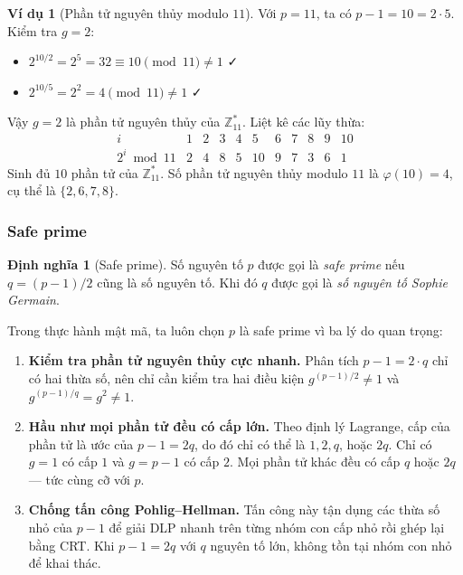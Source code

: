 \documentclass[12pt,a4paper]{report}
\theoremstyle{definition}
\newtheorem{definition}[theorem]{Định nghĩa}
\newtheorem{example}[theorem]{Ví dụ}
\theoremstyle{remark}
\begin{document}
\begin{example}[Phần tử nguyên thủy modulo $11$]
\label{ex:primroot-11}
Với $p = 11$, ta có $p - 1 = 10 = 2 \cdot 5$. Kiểm tra $g = 2$:
\begin{itemize}
    \item $2^{10/2} = 2^5 = 32 \equiv 10 \pmod{11} \neq 1$ \quad ✓
    \item $2^{10/5} = 2^2 = 4 \pmod{11} \neq 1$ \quad ✓
\end{itemize}
Vậy $g = 2$ là phần tử nguyên thủy của $\mathbb{Z}_{11}^*$. Liệt kê các lũy thừa:
\[
\begin{array}{c|cccccccccc}
i & 1 & 2 & 3 & 4 & 5 & 6 & 7 & 8 & 9 & 10 \\
\hline
2^i \bmod 11 & 2 & 4 & 8 & 5 & 10 & 9 & 7 & 3 & 6 & 1
\end{array}
\]
Sinh đủ $10$ phần tử của $\mathbb{Z}_{11}^*$. Số phần tử nguyên thủy modulo $11$ là $\varphi(10) = 4$, cụ thể là $\{2, 6, 7, 8\}$.
\end{example}

\subsubsection{Safe prime}
\label{subsubsec:safe-prime}

\begin{definition}[Safe prime]
Số nguyên tố $p$ được gọi là \emph{safe prime} nếu $q = (p-1)/2$ cũng là số nguyên tố. Khi đó $q$ được gọi là \emph{số nguyên tố Sophie Germain}.
\end{definition}

Trong thực hành mật mã, ta luôn chọn $p$ là safe prime vì ba lý do quan trọng:

\begin{enumerate}[leftmargin=*]
    \item \textbf{Kiểm tra phần tử nguyên thủy cực nhanh.} Phân tích $p - 1 = 2 \cdot q$ chỉ có hai thừa số, nên chỉ cần kiểm tra hai điều kiện $g^{(p-1)/2} \neq 1$ và $g^{(p-1)/q} = g^2 \neq 1$.
    
    \item \textbf{Hầu như mọi phần tử đều có cấp lớn.} Theo định lý Lagrange, cấp của phần tử là ước của $p-1 = 2q$, do đó chỉ có thể là $1, 2, q$, hoặc $2q$. Chỉ có $g = 1$ có cấp $1$ và $g = p-1$ có cấp $2$. Mọi phần tử khác đều có cấp $q$ hoặc $2q$ --- tức cùng cỡ với $p$.
    
    \item \textbf{Chống tấn công Pohlig--Hellman.} Tấn công này tận dụng các thừa số nhỏ của $p - 1$ để giải DLP nhanh trên từng nhóm con cấp nhỏ rồi ghép lại bằng CRT. Khi $p - 1 = 2q$ với $q$ nguyên tố lớn, không tồn tại nhóm con nhỏ để khai thác.
\end{enumerate}
\end{document}

